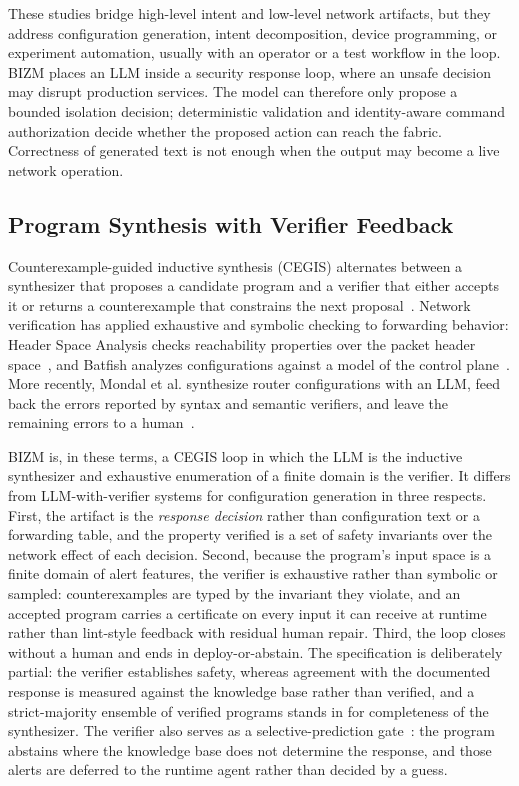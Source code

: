 \documentclass[final,5p]{elsarticle}
\begin{document}
These studies bridge high-level intent and low-level network artifacts, but they address configuration generation, intent decomposition, device programming, or experiment automation, usually with an operator or a test workflow in the loop. BIZM places an LLM inside a security response loop, where an unsafe decision may disrupt production services. The model can therefore only propose a bounded isolation decision; deterministic validation and identity-aware command authorization decide whether the proposed action can reach the fabric. Correctness of generated text is not enough when the output may become a live network operation.

\subsection{Program Synthesis with Verifier Feedback}
\label{sec:rw_synthesis}

Counterexample-guided inductive synthesis (CEGIS) alternates between a synthesizer that proposes a candidate program and a verifier that either accepts it or returns a counterexample that constrains the next proposal~\cite{solarlezama2006sketching,gulwani2017synthesis}. Network verification has applied exhaustive and symbolic checking to forwarding behavior: Header Space Analysis checks reachability properties over the packet header space~\cite{kazemian2012hsa}, and Batfish analyzes configurations against a model of the control plane~\cite{fogel2015batfish}. More recently, Mondal et al. synthesize router configurations with an LLM, feed back the errors reported by syntax and semantic verifiers, and leave the remaining errors to a human~\cite{mondal2023routerconfig}.

BIZM is, in these terms, a CEGIS loop in which the LLM is the inductive synthesizer and exhaustive enumeration of a finite domain is the verifier. It differs from LLM-with-verifier systems for configuration generation in three respects. First, the artifact is the \emph{response decision} rather than configuration text or a forwarding table, and the property verified is a set of safety invariants over the network effect of each decision. Second, because the program's input space is a finite domain of alert features, the verifier is exhaustive rather than symbolic or sampled: counterexamples are typed by the invariant they violate, and an accepted program carries a certificate on every input it can receive at runtime rather than lint-style feedback with residual human repair. Third, the loop closes without a human and ends in deploy-or-abstain. The specification is deliberately partial: the verifier establishes safety, whereas agreement with the documented response is measured against the knowledge base rather than verified, and a strict-majority ensemble of verified programs stands in for completeness of the synthesizer. The verifier also serves as a selective-prediction gate~\cite{geifman2017selective}: the program abstains where the knowledge base does not determine the response, and those alerts are deferred to the runtime agent rather than decided by a guess.
\end{document}
